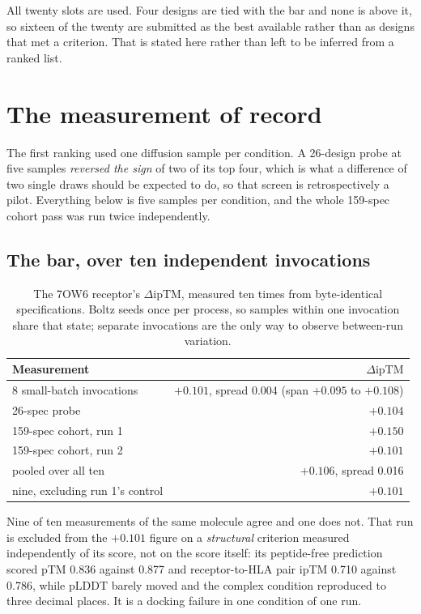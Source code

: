 \documentclass[11pt,a4paper]{article}
\newcommand{\drop}{\ensuremath{\Delta\text{ipTM}}}
\begin{document}
All twenty slots are used. Four designs are tied with the bar and none is above it, so sixteen of
the twenty are submitted as the best available rather than as designs that met a criterion. That
is stated here rather than left to be inferred from a ranked list.

\section{The measurement of record}

The first ranking used one diffusion sample per condition. A 26-design probe at five samples
\emph{reversed the sign} of two of its top four, which is what a difference of two single draws
should be expected to do, so that screen is retrospectively a pilot. Everything below is five
samples per condition, and the whole 159-spec cohort pass was run twice independently.

\subsection{The bar, over ten independent invocations}

\begin{table}[h]
\centering
\caption{The 7OW6 receptor's \drop, measured ten times from byte-identical specifications. Boltz
seeds once per process, so samples within one invocation share that state; separate invocations
are the only way to observe between-run variation.}
\small
\begin{tabular}{lr}
\toprule
Measurement & \drop \\
\midrule
8 small-batch invocations & $+0.101$, spread 0.004 (span $+0.095$ to $+0.108$) \\
26-spec probe & $+0.104$ \\
159-spec cohort, run 1 & $\mathbf{+0.150}$ \\
159-spec cohort, run 2 & $+0.101$ \\
\midrule
pooled over all ten & $\mathbf{+0.106}$, spread 0.016 \\
nine, excluding run 1's control & $+0.101$ \\
\bottomrule
\end{tabular}
\end{table}

Nine of ten measurements of the same molecule agree and one does not. That run is excluded from
the $+0.101$ figure on a \emph{structural} criterion measured independently of its score, not on
the score itself: its peptide-free prediction scored pTM 0.836 against 0.877 and
receptor-to-HLA pair ipTM 0.710 against 0.786, while pLDDT barely moved and the complex condition
reproduced to three decimal places. It is a docking failure in one condition of one run.
\end{document}
